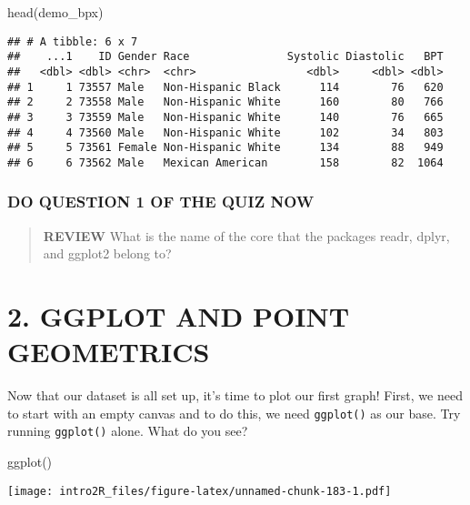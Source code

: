 \documentclass[
]{book}
\newenvironment{Shaded}{\begin{snugshade}}{\end{snugshade}}
\newcommand{\FunctionTok}[1]{\textcolor[rgb]{0.00,0.00,0.00}{#1}}
\newcommand{\NormalTok}[1]{#1}
\begin{document}
\begin{Shaded}
\begin{Highlighting}[]
\FunctionTok{head}\NormalTok{(demo\_bpx)}
\end{Highlighting}
\end{Shaded}

\begin{verbatim}
## # A tibble: 6 x 7
##    ...1    ID Gender Race               Systolic Diastolic   BPT
##   <dbl> <dbl> <chr>  <chr>                 <dbl>     <dbl> <dbl>
## 1     1 73557 Male   Non-Hispanic Black      114        76   620
## 2     2 73558 Male   Non-Hispanic White      160        80   766
## 3     3 73559 Male   Non-Hispanic White      140        76   665
## 4     4 73560 Male   Non-Hispanic White      102        34   803
## 5     5 73561 Female Non-Hispanic White      134        88   949
## 6     6 73562 Male   Mexican American        158        82  1064
\end{verbatim}

\hypertarget{do-question-1-of-the-quiz-now-1}{%
\subsubsection{DO QUESTION 1 OF THE QUIZ NOW}\label{do-question-1-of-the-quiz-now-1}}

\begin{quote}
\textbf{REVIEW} What is the name of the core that the packages readr, dplyr, and ggplot2 belong to?
\end{quote}

\hypertarget{ggplot-and-point-geometrics}{%
\section{2. GGPLOT AND POINT GEOMETRICS}\label{ggplot-and-point-geometrics}}

Now that our dataset is all set up, it's time to plot our first graph! First, we need to start with an empty canvas and to do this, we need \texttt{ggplot()} as our base. Try running \texttt{ggplot()} alone. What do you see?

\begin{Shaded}
\begin{Highlighting}[]
\FunctionTok{ggplot}\NormalTok{()}
\end{Highlighting}
\end{Shaded}

\texttt{[image: intro2R\_files/figure-latex/unnamed-chunk-183-1.pdf]}
\end{document}
